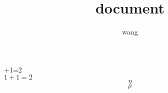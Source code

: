 \documentclass{article}
\title{document}
\author{wang}
\begin{document}
+1=2\\
$1+1=2$
$$\eta$$
$$\mu$$
\end{document}
